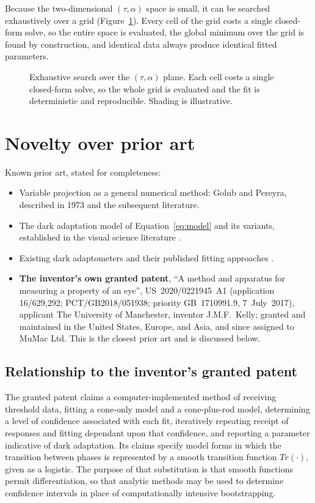 \documentclass[11pt,a4paper]{article}
\begin{document}
Because the two-dimensional $(\tau,\alpha)$ space is small, it can be
searched exhaustively over a grid (Figure~\ref{fig:grid}). Every cell of
the grid costs a single closed-form solve, so the entire space is
evaluated, the global minimum over the grid is found by construction, and
identical data always produce identical fitted parameters.

\begin{figure}[ht]
\centering

\caption{Exhaustive search over the $(\tau,\alpha)$ plane. Each cell costs
a single closed-form solve, so the whole grid is evaluated and the fit is
deterministic and reproducible. Shading is illustrative.}
\label{fig:grid}
\end{figure}

\section{Novelty over prior art}
Known prior art, stated for completeness:
\begin{itemize}[nosep]
\item Variable projection as a general numerical method: Golub and
  Pereyra, described in 1973 \cite{Golub:1973aa}  and the subsequent literature.
\item The dark adaptation model of Equation~\eqref{eq:model} and its
  variants, established in the visual science literature \cite{Lamb:2004aa}.
\item Existing dark adaptometers and their published fitting approaches \cite{Jackson:2008ab}.
\item \textbf{The inventor's own granted patent}, ``A method and apparatus
  for measuring a property of an eye'', US~2020/0221945~A1 (application
  16/629,292; PCT/GB2018/051938; priority GB~1710991.9, 7~July~2017),
  applicant The University of Manchester, inventor J.M.F.~Kelly; granted
  and maintained in the United States, Europe, and Asia, and since
  assigned to MuMac Ltd. This is the closest prior art and is discussed
  below.
\end{itemize}

\subsection*{Relationship to the inventor's granted patent}
The granted patent claims a computer-implemented method of receiving
threshold data, fitting a cone-only model and a cone-plus-rod model,
determining a level of confidence associated with each fit, iteratively repeating
receipt of responses and fitting dependant upon that confidence, and reporting a
parameter indicative of dark adaptation. Its claims specify
model forms in which the transition between phases is represented by a
smooth transition function $Tr(\cdot)$, given as a logistic. The
purpose of that substitution is that smooth functions permit
differentiation, so that analytic methods may be used to determine
confidence intervals in place of computationally intensive bootstrapping.
\end{document}
